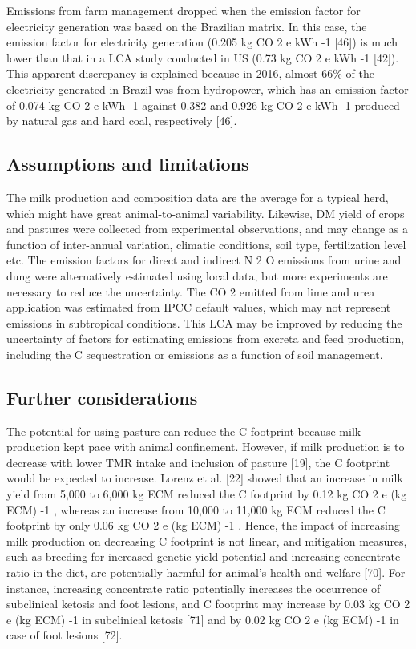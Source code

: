 \documentclass[11pt,a4paper]{article}
\begin{document}
Emissions from farm management dropped when the emission factor for electricity generation was based on the Brazilian matrix. In this case, the emission factor for electricity generation (0.205 kg CO 2 e kWh -1 [46]) is much lower than that in a LCA study conducted in US (0.73 kg CO 2 e kWh -1 [42]). This apparent discrepancy is explained because in 2016, almost 66\% of the electricity generated in Brazil was from hydropower, which has an emission factor of 0.074 kg CO 2 e kWh -1 against 0.382 and 0.926 kg CO 2 e kWh -1 produced by natural gas and hard coal, respectively [46].

\subsection{Assumptions and limitations}

The milk production and composition data are the average for a typical herd, which might have great animal-to-animal variability. Likewise, DM yield of crops and pastures were collected from experimental observations, and may change as a function of inter-annual variation, climatic conditions, soil type, fertilization level etc. The emission factors for direct and indirect N 2 O emissions from urine and dung were alternatively estimated using local data, but more experiments are necessary to reduce the uncertainty. The CO 2 emitted from lime and urea application was estimated from IPCC default values, which may not represent emissions in subtropical conditions. This LCA may be improved by reducing the uncertainty of factors for estimating emissions from excreta and feed production, including the C sequestration or emissions as a function of soil management.

\subsection{Further considerations}

The potential for using pasture can reduce the C footprint because milk production kept pace with animal confinement. However, if milk production is to decrease with lower TMR intake and inclusion of pasture [19], the C footprint would be expected to increase. Lorenz et al. [22] showed that an increase in milk yield from 5,000 to 6,000 kg ECM reduced the C footprint by 0.12 kg CO 2 e (kg ECM) -1 , whereas an increase from 10,000 to 11,000 kg ECM reduced the C footprint by only 0.06 kg CO 2 e (kg ECM) -1 . Hence, the impact of increasing milk production on decreasing C footprint is not linear, and mitigation measures, such as breeding for increased genetic yield potential and increasing concentrate ratio in the diet, are potentially harmful for animal’s health and welfare [70]. For instance, increasing concentrate ratio potentially increases the occurrence of subclinical ketosis and foot lesions, and C footprint may increase by 0.03 kg CO 2 e (kg ECM) -1 in subclinical ketosis [71] and by 0.02 kg CO 2 e (kg ECM) -1 in case of foot lesions [72].
\end{document}
